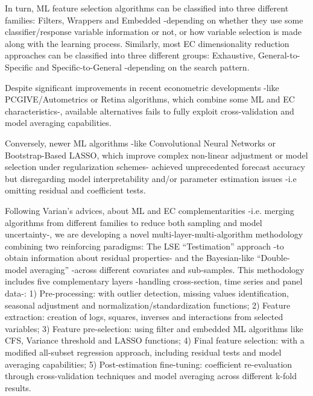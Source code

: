 \documentclass{juliacon}
\begin{document}
In turn, ML feature selection algorithms can be classified into three different families: Filters, Wrappers and Embedded -depending on whether they use some classifier/response variable information or not, or how variable selection is made along with the learning process. Similarly, most EC dimensionality reduction approaches can be classified into three different groups: Exhaustive, General-to-Specific and Specific-to-General -depending on the search pattern. \vskip 6pt

Despite significant improvements in recent econometric developments -like PCGIVE/Autometrics or Retina algorithms, which combine some ML and EC characteristics-, available alternatives fails to fully exploit cross-validation and model averaging capabilities. \vskip 6pt

Conversely, newer ML algorithms -like Convolutional Neural Networks or Bootstrap-Based LASSO, which improve complex non-linear adjustment or model selection under regularization schemes- achieved unprecedented forecast accuracy but disregarding model interpretability and/or parameter estimation issues -i.e omitting residual and coefficient tests. \vskip 6pt

Following Varian’s advices, about ML and EC complementarities -i.e. merging algorithms from different families to reduce both sampling and model uncertainty-, we are developing a novel multi-layer-multi-algorithm methodology combining two reinforcing paradigms: The LSE “Testimation” approach -to obtain information about residual properties- and the Bayesian-like “Double-model averaging” -across different covariates and sub-samples. This methodology includes five complementary layers -handling cross-section, time series and panel data-: 1) Pre-processing: with outlier detection, missing values identification, seasonal adjustment and normalization/standardization functions; 2) Feature extraction: creation of logs, squares, inverses and interactions from selected variables; 3) Feature pre-selection: using filter and embedded ML algorithms like CFS, Variance threshold and LASSO functions; 4) Final feature selection: with a modified all-subset regression approach, including residual tests and model averaging capabilities; 5) Post-estimation fine-tuning: coefficient re-evaluation through cross-validation techniques and model averaging across different k-fold results. \vskip 6pt
\end{document}
